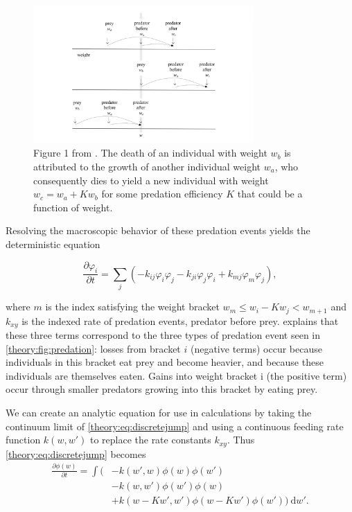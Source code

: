 \documentclass[../main]{subfiles}
\begin{document}
  \begin{figure}[ht]
    \centering
    \caption{Figure 1 from \cite{datta2010}. The death of an individual with weight $w_b$ is attributed to the growth of another individual weight $w_a$, who consequently dies to yield a new individual with weight $w_c = w_a + K w_b$ for some predation efficiency $K$ that could be a function of weight. \label{theory:fig:predation}}
    \includegraphics[width=0.75\textwidth]{_assets/stochastic_predation.png}
  \end{figure}

  Resolving the macroscopic behavior of these predation events yields the deterministic equation

  \begin{equation}\label{theory:eq:discretejump}
    \frac{\partial \varphi_i}{\partial t} = \sum_j \left(- k_{ij} \varphi_i \varphi_j - k_{ji} \varphi_j \varphi_i + k_{mj} \varphi_m \varphi_j \right),
  \end{equation}

  where $m$ is the index satisfying the weight bracket $w_m \leq w_i - K w_j < w_{m+1}$ and $k_{xy}$ is the indexed rate of predation events, predator before prey. \cite{datta2010} explains that these three terms correspond to the three types of predation event seen in \autoref{theory:fig:predation}: losses from bracket $i$ (negative terms) occur because individuals in this bracket eat prey and become heavier, and because these individuals are themselves eaten. Gains into weight bracket i (the positive term) occur through smaller predators growing into this bracket by eating prey.

  We can create an analytic equation for use in calculations by taking the continuum limit of \autoref{theory:eq:discretejump} and using a continuous feeding rate function $k(w, w')$ to replace the rate constants $k_{xy}$. Thus \autoref{theory:eq:discretejump} becomes
  \begin{align}\label{theory:eq:jumpgrowth}
    \frac{\partial \phi(w)}{\partial t}
    = \int ( &- k(w', w) \phi(w)\phi(w') \nonumber \\
    & - k(w, w')\phi(w')\phi(w) \nonumber \\
    & + k(w - Kw', w')\phi(w - Kw')\phi(w')) \: \mathrm{d}w'.
  \end{align}
\end{document}
